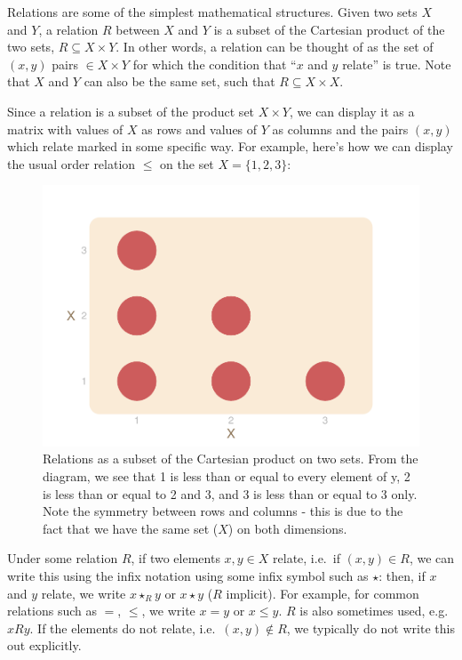 \documentclass[
]{book}
\theoremstyle{definition}
\theoremstyle{definition}
\theoremstyle{definition}
\theoremstyle{definition}
\theoremstyle{remark}
\begin{document}
Relations are some of the simplest mathematical structures. Given two sets \(X\) and \(Y\), a relation \(R\) between \(X\) and \(Y\) is a subset of the Cartesian product of the two sets, \(R \subseteq X \times Y\). In other words, a relation can be thought of as the set of \((x, y)\) pairs \(\in X \times Y\) for which the condition that ``\(x\) and \(y\) relate'' is true. Note that \(X\) and \(Y\) can also be the same set, such that \(R \subseteq X \times X\).

Since a relation is a subset of the product set \(X \times Y\), we can display it as a matrix with values of \(X\) as rows and values of \(Y\) as columns and the pairs \((x, y)\) which relate marked in some specific way. For example, here's how we can display the usual order relation \(\leq\) on the set \(X = \{ 1, 2, 3 \}\):

\begin{figure}

{\centering \includegraphics{_main_files/figure-latex/relations-subset-1} 

}

\caption{Relations as a subset of the Cartesian product on two sets. From the diagram, we see that 1 is less than or equal to every element of y, 2 is less than or equal to 2 and 3, and 3 is less than or equal to 3 only. Note the symmetry between rows and columns - this is due to the fact that we have the same set ($X$) on both dimensions. }\label{fig:relations-subset}
\end{figure}

Under some relation \(R\), if two elements \(x, y \in X\) relate, i.e.~if \((x, y) \in R\), we can write this using the infix notation using some infix symbol such as \(\star\): then, if \(x\) and \(y\) relate, we write \(x \star_R y\) or \(x \star y\) (\(R\) implicit). For example, for common relations such as \(=\), \(\leq\), we write \(x = y\) or \(x \leq y\). \(R\) is also sometimes used, e.g.~\(x R y\). If the elements do not relate, i.e.~\((x, y) \not \in R\), we typically do not write this out explicitly.
\end{document}
